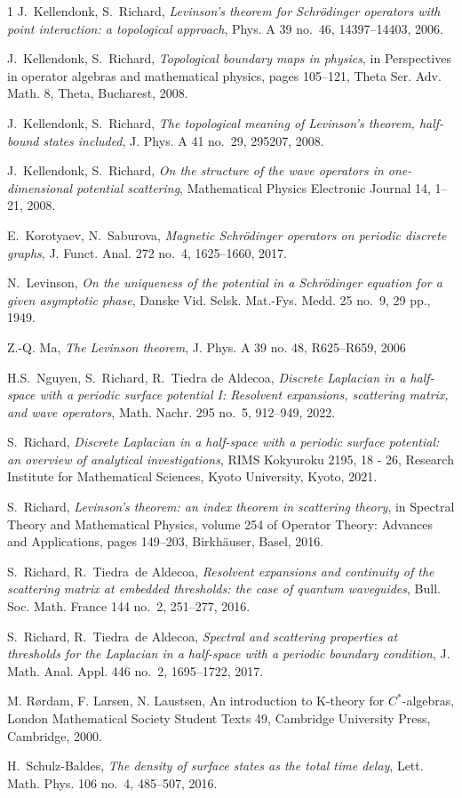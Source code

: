 \documentclass[11pt]{article}
\begin{document}
\begin{thebibliography}{1}
J.~Kellendonk, S.~Richard,
\emph{Levinson's theorem for Schr\"odinger operators with point interaction: a topological approach},
Phys. A 39 no.~46, 14397--14403, 2006.

J.~Kellendonk, S.~Richard,
\emph{Topological boundary maps in physics},
in Perspectives in operator algebras and mathematical physics, pages 105--121, Theta Ser. Adv. Math. 8, Theta, Bucharest, 2008.

J.~Kellendonk, S.~Richard,
\emph{The topological meaning of Levinson's theorem, half-bound states included},
J. Phys. A 41 no.~29, 295207, 2008.

J.~Kellendonk, S.~Richard,
\emph{On the structure of the wave operators in one-dimensional potential scattering}, 
Mathematical Physics Electronic Journal 14, 1--21, 2008.

E.~Korotyaev, N.~Saburova,
\emph{Magnetic Schr\"odinger operators on periodic discrete graphs},
J. Funct. Anal. 272 no.~4, 1625--1660, 2017.

N.~Levinson, 
\emph{On the uniqueness of the potential in a Schr\"odinger equation for a given
asymptotic phase}, Danske Vid. Selsk. Mat.-Fys. Medd. 25 no.~9, 29 pp., 1949.

Z.-Q. Ma, 
\emph{The Levinson theorem}, J. Phys. A 39 no. 48, R625–R659, 2006

H.S.~Nguyen, S.~Richard, R.~Tiedra de Aldecoa, 
\emph{Discrete Laplacian in a half‐space with a periodic surface potential I: Resolvent expansions, scattering matrix, and wave operators}, Math. Nachr.  295 no.~5, 912--949, 2022. 

S.~Richard, 
\emph{Discrete Laplacian in a half-space with a periodic surface potential: an overview of analytical investigations},
RIMS Kokyuroku 2195, 18 - 26, Research Institute for Mathematical Sciences, Kyoto University, Kyoto, 2021. 

S.~Richard,
\emph{Levinson's theorem: an index theorem in scattering theory},
in Spectral Theory and Mathematical Physics, volume 254 of Operator Theory: Advances and Applications, pages 149--203, Birkh\"auser, Basel, 2016.

S.~Richard, R.~Tiedra~de Aldecoa,
\emph{Resolvent expansions and continuity of the scattering matrix at embedded
thresholds: the case of quantum waveguides},
Bull. Soc. Math. France 144 no.~2, 251--277, 2016.

S.~Richard, R.~Tiedra~de Aldecoa,
\emph{Spectral and scattering properties at thresholds for the {L}aplacian in a
half-space with a periodic boundary condition},
J. Math. Anal. Appl. 446 no.~2, 1695--1722, 2017.

M. Rørdam, F. Larsen, N. Laustsen, 
\newblock An introduction to K-theory for $C^*$-algebras,
\newblock London Mathematical Society Student Texts 49, Cambridge University Press, Cambridge, 2000.

H.~Schulz-Baldes,
\emph{The density of surface states as the total time delay},
Lett. Math. Phys. 106 no.~4, 485--507, 2016.

\end{thebibliography}
\end{document}
